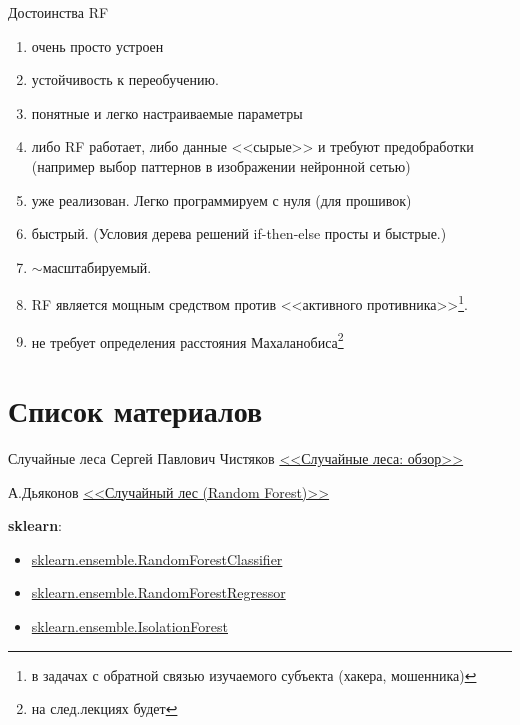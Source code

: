 \begin{frame}{Достоинства RF}
	\footnotesize
	\begin{enumerate}
		\item очень просто устроен
		\item устойчивость к переобучению. 
		\item понятные и легко настраиваемые параметры
		\item либо RF работает, либо данные <<сырые>> и требуют предобработки (например выбор паттернов в изображении нейронной сетью)
		\item уже реализован. Легко программируем с нуля (для прошивок)
		\item быстрый. (Условия дерева решений if-then-else просты и быстрые.)
		\item $\sim$масштабируемый.
		\item RF является мощным средством против <<активного противника>>\footnote{
			в задачах с обратной связью изучаемого субъекта (хакера, мошенника)
		}. 
		\item не требует определения расстояния Махаланобиса\footnote{на след.лекциях будет}
	\end{enumerate}
\end{frame}

\section{Список материалов}

\begin{frame}{Случайные леса}
	Сергей Павлович Чистяков \href{http://resources.krc.karelia.ru/transactions/doc/trudy2013/trudy_2013_1_117-136.pdf}{<<Случайные леса: обзор>>}
	
	А.Дьяконов 
	\href{https://dyakonov.org/2016/11/14/\%D1\%81\%D0\%BB\%D1\%83\%D1\%87\%D0\%B0\%D0\%B9\%D0\%BD\%D1\%8B\%D0\%B9-\%D0\%BB\%D0\%B5\%D1\%81-random-forest/}{<<Случайный лес (Random Forest)>>}
	
	\textbf{sklearn}:
	\begin{itemize}
	\item \href{https://scikit-learn.org/stable/modules/generated/sklearn.ensemble.RandomForestClassifier.html}{sklearn.ensemble.RandomForestClassifier}
	\item \href{https://scikit-learn.org/stable/modules/generated/sklearn.ensemble.RandomForestRegressor.html}{sklearn.ensemble.RandomForestRegressor}
	\item \href{https://scikit-learn.org/stable/modules/generated/sklearn.ensemble.IsolationForest.html}{sklearn.ensemble.IsolationForest}
	\end{itemize}
\end{frame}

